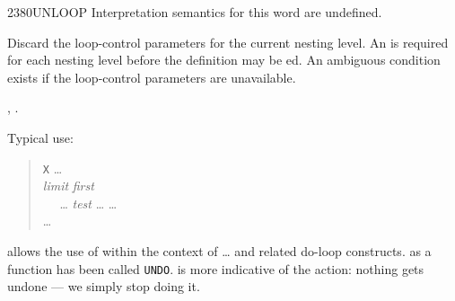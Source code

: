 \begin{worddef}{2380}{UNLOOP}
\interpret
	Interpretation semantics for this word are undefined.

\execute
	\stack{}{}

	Discard the loop-control parameters for the current nesting
	level. An  is required for each nesting level
	before the definition may be ed. An ambiguous
	condition exists if the loop-control parameters are unavailable.

\see {},
	.

	\begin{rationale} %
		Typical use:
		\begin{quote}
			\word{:} \texttt{X} {\ldots} \\
			\tab \emph{limit} \emph{first}  \\
			\tab~~ {\ldots} \emph{test} 
				{\ldots}    {\ldots} \\
			\tab {} {\ldots} \\
			\word{;}
		\end{quote}

		 allows the use of  within the context
		of  {\ldots}  and related do-loop constructs.
		 as a function has been called \texttt{UNDO}.
		 is more indicative of the action: nothing gets
		undone --- we simply stop doing it.
	\end{rationale}

	\begin{testing} %
		 \\
		 \\
		 \\
	\end{testing}
\end{worddef}


